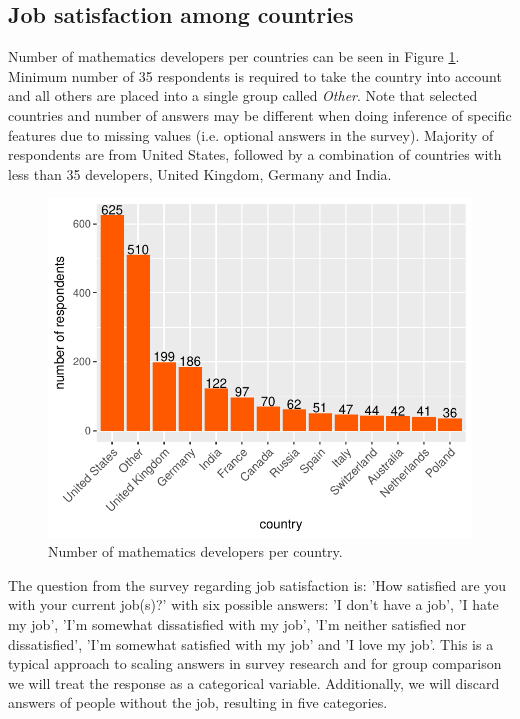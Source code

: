 \documentclass{article}
\begin{document}
\subsection{Job satisfaction among countries}
Number of mathematics developers per countries can be seen in Figure \ref{fig_0}. Minimum number of 35 respondents is required to take the country into account and all others are placed into a single group called \textit{Other}. Note that selected countries and number of answers may be different when doing inference of specific features due to missing values (i.e. optional answers in the survey). Majority of respondents are from United States, followed by a combination of countries with less than 35 developers, United Kingdom, Germany and India.


\begin{figure}[H]
\centering
\includegraphics{report-005}
\caption{Number of mathematics developers per country.}\label{fig_0}
\end{figure}

The question from the survey regarding job satisfaction is: 'How satisfied are you with your current job(s)?' with six possible answers: 'I don't have a job', 'I hate my job', 'I'm somewhat dissatisfied with my job', 'I'm neither satisfied nor dissatisfied', 'I'm somewhat satisfied with my job' and 'I love my job'. This is a typical approach to scaling answers in survey research and for group comparison we will treat the response as a categorical variable. Additionally, we will discard answers of people without the job, resulting in five categories.
\end{document}

